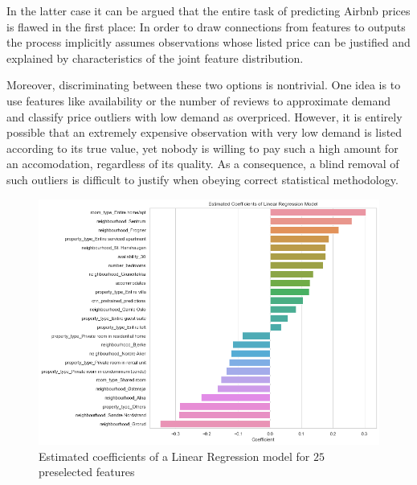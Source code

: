 \documentclass[12pt, letterpaper]{article}
\begin{document}
In the latter case it can be argued that the entire task of predicting Airbnb prices is flawed in the first place:
In order to draw connections from features to outputs the process implicitly assumes observations whose listed price can be justified and explained by characteristics of the joint feature distribution.

Moreover, discriminating between these two options is nontrivial.
One idea is to use features like availability or the number of reviews to approximate demand and classify price outliers with low demand as overpriced.
However, it is entirely possible that an extremely expensive observation with very low demand is listed according to its true value, yet nobody is willing to pay such a high amount for an accomodation, regardless of its quality.
As a consequence, a blind removal of such outliers is difficult to justify when obeying correct statistical methodology.

\newpage




\appendix

\begin{figure}[t]
    \centering
    \includegraphics[width=\textwidth]{coefficient_plot.png}
    \caption{Estimated coefficients of a Linear Regression model for $25$ preselected features}
    \label{fig:coefficient-plot}
\end{figure}
\end{document}
